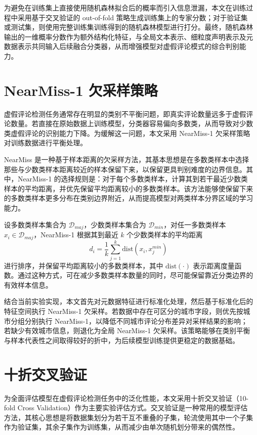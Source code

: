 \documentclass[UTF8,oneside,openright,fontset=none]{ctexbook}
\numberwithin{equation}{chapter}
\begin{document}
为避免在训练集上直接使用随机森林拟合后的概率而引入信息泄漏，本文在训练过程中采用基于交叉验证的 out-of-fold 策略生成训练集上的专家分数；对于验证集或测试集，则使用完整训练集训练得到的随机森林模型进行打分。最终，随机森林输出的一维概率分数作为额外结构化特征，与全局文本表示、细粒度声明表示及元数据表示共同输入后续融合分类器，从而增强模型对虚假评论模式的综合判别能力。

\section{NearMiss-1 欠采样策略}
虚假评论检测任务通常存在明显的类别不平衡问题，即真实评论数量远多于虚假评论数量。若直接在原始数据上训练模型，分类器容易偏向多数类，从而导致对少数类虚假评论的识别能力下降。为缓解这一问题，本文采用 NearMiss-1 欠采样策略对训练数据进行平衡处理。

NearMiss 是一种基于样本距离的欠采样方法，其基本思想是在多数类样本中选择那些与少数类样本距离较近的样本保留下来，以保留更具判别难度的边界信息。其中，NearMiss-1 的选择规则是：对于每个多数类样本，计算其到若干最近少数类样本的平均距离，并优先保留平均距离较小的多数类样本。该方法能够使保留下来的多数类样本更多分布在类别边界附近，从而提高模型对两类样本分界区域的学习能力。

设多数类样本集合为 $\mathcal{D}_{maj}$，少数类样本集合为 $\mathcal{D}_{min}$，对任一多数类样本 $x_i \in \mathcal{D}_{maj}$，NearMiss-1 根据其到最近 $k$ 个少数类样本的平均距离
\begin{equation}
  d_i = \frac{1}{k}\sum_{j=1}^{k}\mathrm{dist}(x_i, x_j^{min})
\end{equation}
进行排序，并保留平均距离较小的多数类样本，其中 $\mathrm{dist}(\cdot)$ 表示距离度量函数。通过这种方式，可在减少多数类样本数量的同时，尽可能保留靠近分类边界的有效样本信息。

结合当前实验实现，本文首先对元数据特征进行标准化处理，然后基于标准化后的特征空间执行 NearMiss-1 欠采样。若数据中存在可区分的城市字段，则优先按城市分组分别执行 NearMiss-1，以降低不同城市评论分布差异对采样结果的影响；若缺少有效城市信息，则退化为全局 NearMiss-1 欠采样。该策略能够在类别平衡与样本代表性之间取得较好的折中，为后续模型训练提供更稳定的数据基础。

\section{十折交叉验证}
为全面评估模型在虚假评论检测任务中的泛化性能，本文采用十折交叉验证（10-fold Cross Validation）作为主要实验评估方式。交叉验证是一种常用的模型评估方法，其核心思想是将数据集划分为若干互不重叠的子集，轮流使用其中一个子集作为验证集，其余子集作为训练集，从而减少由单次随机划分带来的偶然性。
\end{document}

